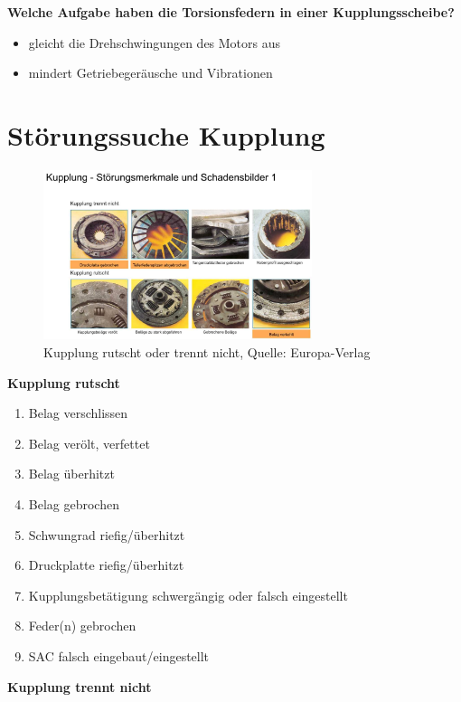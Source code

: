 \textbf{Welche Aufgabe haben die Torsionsfedern in einer
Kupplungsscheibe?}

\begin{itemize}
\item
  gleicht die Drehschwingungen des Motors aus
\item
  mindert Getriebegeräusche und Vibrationen
\end{itemize}

\newpage

\section{Störungssuche Kupplung}\label{stoerungssuche-kupplung}

\begin{figure}[!ht]%
\centering
\includegraphics[width=0.7\textwidth]{images/Kupplung/Kupplung-5.pdf}
\caption{Kupplung rutscht oder trennt nicht, Quelle: Europa-Verlag}
\end{figure}

\textbf{Kupplung rutscht}

\begin{enumerate}
\item
  Belag verschlissen
\item
  Belag verölt, verfettet
\item
  Belag überhitzt
\item
  Belag gebrochen
\item
  Schwungrad riefig/überhitzt
\item
  Druckplatte riefig/überhitzt
\item
  Kupplungsbetätigung schwergängig oder falsch eingestellt
\item
  Feder(n) gebrochen
\item
  SAC falsch eingebaut/eingestellt
\end{enumerate}

\textbf{Kupplung trennt nicht}

